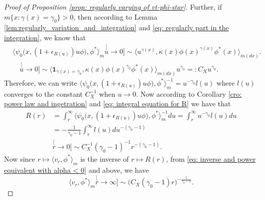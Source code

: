 \documentclass[12pt, a4paper]{amsart}
\theoremstyle{definition}
\numberwithin{equation}{section}
\begin{document}
\begin{proof}[Proof of Proposition \ref{prop: regularly varying of vt-phi-star}]
	Further, if $m\{x: \gamma(x) = \gamma_0\}> 0$, then according to Lemma \ref{lem:regularly_variation_and_integration} and \eqref{eq: regularly part in the integration}, we know that
\[\begin{split}
	&\big\langle \psi_0 \big(x,( 1 + \epsilon_{R(u)} ) u \phi \big), \phi^* \big\rangle_m
	\stackrel[u\to 0]{}{\sim}  \langle u^{\gamma(x)} , \kappa (x)\phi(x)^{\gamma(x)} \phi^*(x) 
	\rangle_{m(dx)}.
	\\ &\quad \stackrel[u\to 0]{}{\sim}  \langle \mathbf 1_{\gamma(x)= \gamma_0}, \kappa (x)\phi(x)^{\gamma_0} \phi^*(x) 
	\rangle_{m(dx)} u^{\gamma_0}
	=: C_X u^{\gamma_0}.
\end{split}\]
	Therefore, we can write $\big\langle \psi_0 \big(x,( 1 + \epsilon_{R(u)} ) u \phi \big), \phi^* \big\rangle_m^{-1} = u^{-\gamma_0} l(u)$ where $l(u)$ converges to the constant $C_X^{-1}$ when $u \to 0$.
	Now according to 
	Corollary \ref{cro: power law and ingetration} and \eqref{eq: integral equation for R} 
	we have that
\[\begin{split}
	R(r)
	&= \int_r^\infty \big\langle \psi_0 \big(x,( 1 + \epsilon_{R(u)} ) u \phi \big), \phi^* \big\rangle_m^{-1} du
	= \int_r^\infty u^{-\gamma_0} l(u) du
	\\&= -\frac{1}{\gamma_0-1}\int_r^\infty l(u) du^{-(\gamma_0 - 1)}
	\\&\stackrel[r\to 0]{}{\sim} C_X^{-1} (\gamma_0-1)^{-1} r^{-(\gamma_0 - 1)}.
\end{split}\]
	Now since $r\mapsto \langle v_r,\phi^*\rangle_m$ is the inverse of $r\mapsto R(r)$, from 
	\eqref{eq: inverse and power equivalent with alpha < 0} and above, 
	we have
\[
	\langle v_r,\phi^*\rangle_m
	\stackrel[r\to \infty]{}{\sim} \big(C_X (\gamma_0-1) r \big)^{-\frac{1}{\gamma_0 - 1}}.
\]
\end{proof}

\end{document}
